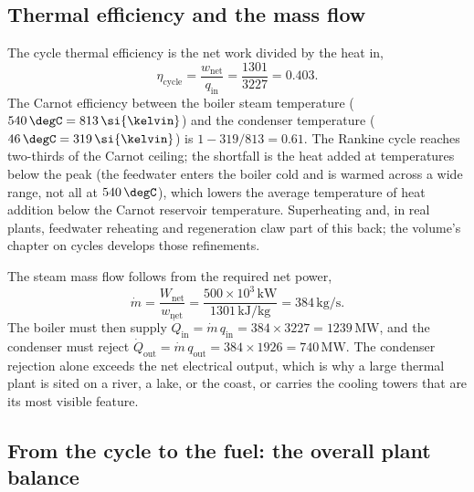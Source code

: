 \subsection{Thermal efficiency and the mass flow}

The cycle thermal efficiency is the net work divided by the heat in,
\[
\eta_{\text{cycle}} = \frac{w_{\text{net}}}{q_{\text{in}}}
  = \frac{1301}{3227} = 0.403.
\]
The Carnot efficiency between the boiler steam temperature
($540\,\degC = 813\,\si{\kelvin}$) and the condenser temperature
($46\,\degC = 319\,\si{\kelvin}$) is $1 - 319/813 = 0.61$. The Rankine
cycle reaches two-thirds of the Carnot ceiling; the shortfall is the
heat added at temperatures below the peak (the feedwater enters the
boiler cold and is warmed across a wide range, not all at
$540\,\degC$), which lowers the average temperature of heat addition
below the Carnot reservoir temperature. Superheating and, in real
plants, feedwater reheating and regeneration claw part of this back; the
volume's chapter on cycles develops those refinements.

The steam mass flow follows from the required net power,
\[
\dot{m} = \frac{W_{\text{net}}}{w_{\text{net}}}
  = \frac{500 \times 10^3\,\text{kW}}{1301\,\text{kJ}/\text{kg}}
  = 384\,\text{kg}/\text{s}.
\]
The boiler must then supply $\dot{Q}_{\text{in}} = \dot{m}\, q_{\text{in}}
= 384 \times 3227 = 1239\,\text{MW}$, and the condenser must reject
$\dot{Q}_{\text{out}} = \dot{m}\, q_{\text{out}} = 384 \times 1926 =
740\,\text{MW}$. The condenser rejection alone exceeds the net
electrical output, which is why a large thermal plant is sited on a
river, a lake, or the coast, or carries the cooling towers that are its
most visible feature.

\subsection{From the cycle to the fuel: the overall plant balance}

